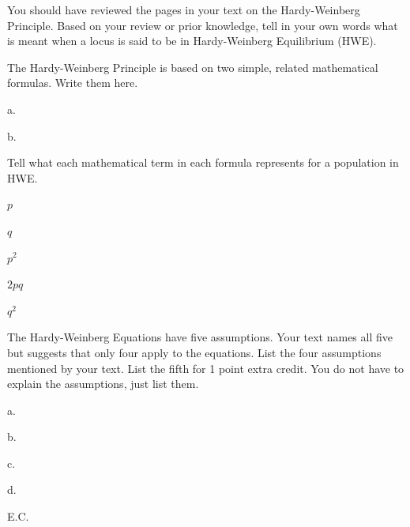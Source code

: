 \documentclass[11pt]{exam}
\begin{document}
\begin{questions}

\question[3]
You should have reviewed the pages in your text on the Hardy-Weinberg Principle. Based on your review or prior knowledge, tell in your own words what is meant when a locus is said to be in Hardy-Weinberg Equilibrium (HWE).

\vspace{4cm}

\question[2]
The Hardy-Weinberg Principle is based on two simple, related mathematical formulas. Write them here. 

\vspace{1cm}

a. \vspace{1.5cm}

b. \vspace{1cm}

\question[5]
Tell what each mathematical term in each formula represents for a population in HWE.

\vspace{1cm}

$p$\vspace{1.5cm}

$q$\vspace{1.5cm}

$p^2$\vspace{1.5cm}

$2pq$\vspace{1.5cm}

$q^2$

\newpage
\question[4]
The Hardy-Weinberg Equations have five assumptions. Your text names all five but suggests that only four apply to the equations. List the four assumptions mentioned by your text. List the fifth for 1 point extra credit. You do not have to explain the assumptions, just list them.

\vspace{1cm}

a. \vspace{1.5cm}

b. \vspace{1.5cm}

c. \vspace{1.5cm}

d. \vspace{1.5cm}

E.C.

\vspace{1.5cm}

\end{questions}
\end{document}
